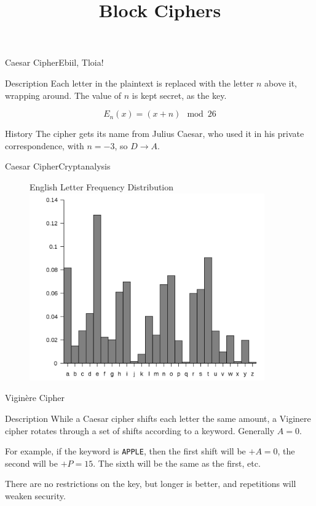 \documentclass{beamer}
\title{Block Ciphers}
\begin{document}
\begin{frame}
	\titlepage
\end{frame}

\begin{frame}{Caesar Cipher}{Ebiil, Tloia!}
	\begin{block}{Description}
		Each letter in the plaintext is replaced with the letter $n$ above it,
		wrapping around. The value of $n$ is kept secret, as the key.

		\[ E_n(x) = (x+n)\mod 26 \]
	\end{block}

	\begin{block}{History}
		The cipher gets its name from Julius Caesar, who used it in his private
		correspondence, with $n = -3$, so $D \rightarrow A$.
	\end{block}
\end{frame}

\begin{frame}{Caesar Cipher}{Cryptanalysis}
	\begin{figure}
		{\centering English Letter Frequency Distribution}
		\includegraphics[width=0.9\textwidth]{letter-frequency.png}
	\end{figure}
\end{frame}

\begin{frame}{Vigin\`ere Cipher}
	\begin{block}{Description}
		While a Caesar cipher shifts each letter the same amount, a Viginere
		cipher rotates through a set of shifts according to a keyword. Generally
		$A=0$.
	\end{block}

	For example, if the keyword is {\tt APPLE}, then the first shift will be
	$+A = 0$, the second will be $+P = 15$. The sixth will be the same as the
	first, etc.

	There are no restrictions on the key, but longer is better, and repetitions
	will weaken security.
\end{frame}
\end{document}
